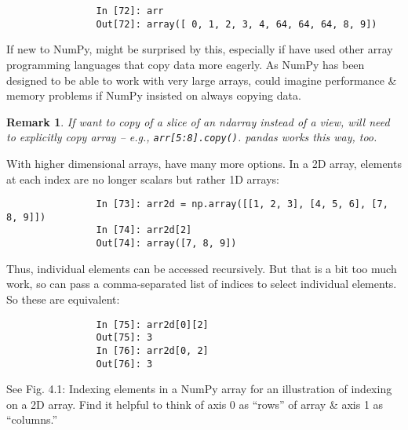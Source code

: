 \documentclass{article}
\newtheorem{remark}{Remark}
\begin{document}
\begin{itemize}
\begin{itemize}
\begin{itemize}
\begin{verbatim}
				In [72]: arr
				Out[72]: array([ 0, 1, 2, 3, 4, 64, 64, 64, 8, 9])
			\end{verbatim}
			If new to NumPy, might be surprised by this, especially if have used other array programming languages that copy data more eagerly. As NumPy has been designed to be able to work with very large arrays, could imagine performance \& memory problems if NumPy insisted on always copying data.
			\begin{remark}
				If want to copy of a slice of an ndarray instead of a view, will need to explicitly copy array -- e.g., {\tt arr[5:8].copy()}. pandas works this way, too.
			\end{remark}
			With higher dimensional arrays, have many more options. In a 2D array, elements at each index are no longer scalars but rather 1D arrays:
			\begin{verbatim}
				In [73]: arr2d = np.array([[1, 2, 3], [4, 5, 6], [7, 8, 9]])
				In [74]: arr2d[2]
				Out[74]: array([7, 8, 9])
			\end{verbatim}
			Thus, individual elements can be accessed recursively. But that is a bit too much work, so can pass a comma-separated list of indices to select individual elements. So these are equivalent:
			\begin{verbatim}
				In [75]: arr2d[0][2]
				Out[75]: 3
				In [76]: arr2d[0, 2]
				Out[76]: 3
			\end{verbatim}
			See {\sf Fig. 4.1: Indexing elements in a NumPy array} for an illustration of indexing on a 2D array. Find it helpful to think of axis 0 as ``rows'' of array \& axis 1 as ``columns.''
			

\end{itemize}
\end{itemize}
\end{itemize}
\end{document}
